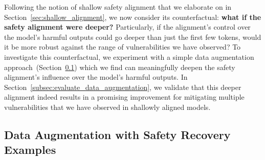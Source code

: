 Following the notion of shallow safety alignment that we elaborate on in Section~\ref{sec:shallow_alignment}, we now consider its counterfactual: \textbf{what if the safety alignment were deeper?} Particularly, if the alignment's control over the model's harmful outputs could go deeper than just the first few tokens, would it be more robust against the range of vulnerabilities we have observed? To investigate this counterfactual, we experiment with a simple data augmentation approach~(Section~\ref{subsec:data_augmentation_approach}) which we find can meaningfully deepen the safety alignment's influence over the model's harmful outputs. In Section~\ref{subsec:evaluate_data_augmentation}, we validate that this deeper alignment indeed results in a promising improvement for mitigating multiple vulnerabilities that we have observed in shallowly aligned models.


\subsection{Data Augmentation with Safety Recovery Examples}
\label{subsec:data_augmentation_approach}



